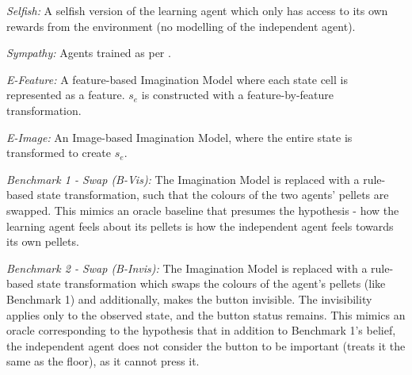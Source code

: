 \emph{Selfish:} A selfish version of the learning agent which only has access to its own rewards from the environment (no modelling of the independent agent).

\emph{Sympathy:} Agents trained as per \cite{SympathyPaper}.

\emph{E-Feature:} A feature-based Imagination Model where each state cell is represented as a feature. $s_{e}$ is constructed with a feature-by-feature transformation.

\emph{E-Image:} An Image-based Imagination Model, where the entire state is transformed to create $s_{e}$.

\emph{Benchmark 1 - Swap (B-Vis):} The Imagination Model is replaced with a rule-based state transformation, such that the colours of the two agents' pellets are swapped. This mimics an oracle baseline that presumes the hypothesis - how the learning agent feels about its pellets is how the independent agent feels towards its own pellets. 

\emph{Benchmark 2 - Swap (B-Invis):} The Imagination Model is replaced with a rule-based state transformation which swaps the colours of the agent's pellets (like Benchmark 1) and additionally, makes the button invisible. The invisibility applies only to the observed state, and the button status remains. This mimics an oracle corresponding to the hypothesis that in addition to Benchmark 1's belief, the independent agent does not consider the button to be important (treats it the same as the floor), as it cannot press it.



